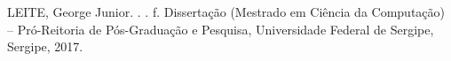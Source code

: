\documentclass[
	12pt,				%
	oneside,			%
	a4paper,			%
	english,			%
	brazil				%
	]{abntex2ppgsi}
\begin{document}
\setlength{\absparsep}{18pt} %
\begin{resumo}

% 
%
% 
%
LEITE, George Junior. \textbf{\imprimirtitulo}. \imprimirdata. \pageref{LastPage} f. Dissertação (Mestrado em Ciência da Computação) – Pró-Reitoria de Pós-Graduação e Pesquisa, Universidade Federal de Sergipe, Sergipe, 2017.



\end{resumo}
\end{document}
